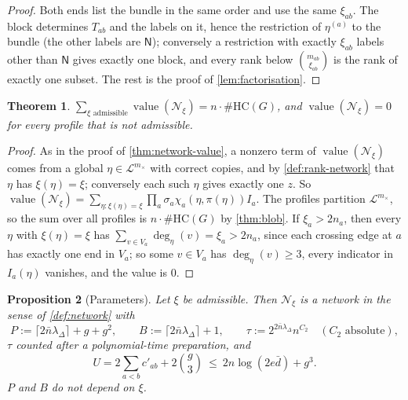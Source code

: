 \documentclass[11pt]{amsart}
\theoremstyle{plain}
\newtheorem{theorem}{Theorem}[section]
\newtheorem{proposition}[theorem]{Proposition}
\theoremstyle{definition}
\theoremstyle{remark}
\numberwithin{equation}{section}
\newcommand{\HC}{\#\mathrm{HC}}
\newcommand{\cL}{\mathcal{L}}
\newcommand{\lab}[1]{\mathsf{#1}}
\newcommand{\mx}{m_{\times}}
\begin{document}
\begin{proof}
Both ends list the bundle in the same order and use the same $\xi_{ab}$. The block determines
$T_{ab}$ and the labels on it, hence the restriction of $\eta^{(a)}$ to the bundle (the other labels
are $\lab N$); conversely a restriction with exactly $\xi_{ab}$ labels other than $\lab N$ gives exactly
one block, and every rank below $\binom{m_{ab}}{\xi_{ab}}$ is the rank of exactly one subset. The
rest is the proof of \cref{lem:factorisation}.
\end{proof}

\begin{theorem}\label{thm:rank-value}
$\sum_{\xi\text{ admissible}}\operatorname{value}(\mathcal N_\xi)=n\cdot\HC(G)$, and
$\operatorname{value}(\mathcal N_\xi)=0$ for every profile that is not admissible.
\end{theorem}

\begin{proof}
As in the proof of \cref{thm:network-value}, a nonzero term of $\operatorname{value}(\mathcal N_\xi)$
comes from a global $\eta\in\cL^{\mx}$ with correct copies, and by \cref{def:rank-network} that
$\eta$ has $\xi(\eta)=\xi$; conversely each such $\eta$ gives exactly one $z$. So
$\operatorname{value}(\mathcal N_\xi)=\sum_{\eta:\xi(\eta)=\xi}\prod_a\sigma_a\chi_a(\eta,\pi(\eta))I_a$.
The profiles partition $\cL^{\mx}$, so the sum over all profiles is $n\cdot\HC(G)$ by
\cref{thm:blob}. If $\xi_a>2n_a$, then every $\eta$ with $\xi(\eta)=\xi$ has
$\sum_{v\in V_a}\deg_\eta(v)=\xi_a>2n_a$, since each crossing edge at $a$ has exactly one end in
$V_a$; so some $v\in V_a$ has $\deg_\eta(v)\ge3$, every indicator in $I_a(\eta)$ vanishes, and the
value is $0$.
\end{proof}

\begin{proposition}[Parameters]\label{prop:rank-parameters}
Let $\xi$ be admissible. Then $\mathcal N_\xi$ is a network in the sense of \cref{def:network} with
\[
  P:=\lceil2\bar n\lambda_\Delta\rceil+g+g^2,\qquad B:=\lceil2\bar n\lambda_\Delta\rceil+1,\qquad
  \tau:=2^{2\bar n\lambda_\Delta}n^{C_2}\quad(C_2\text{ absolute}),
\]
$\tau$ counted after a polynomial-time preparation, and
\[
  U=2\sum_{a<b}c'_{ab}+2\binom g3\ \le\ 2n\log(2e\bar d)+g^3 .
\]
$P$ and $B$ do not depend on $\xi$.
\end{proposition}
\end{document}
